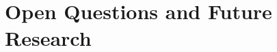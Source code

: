 \section{Open Questions and Future Research}

\pagebreak


\clearpage


\thispagestyle{empty}
\pagestyle{plain}
\clearpage

\listoffigures

\listoftables
\thispagestyle{empty}
\pagestyle{plain}
